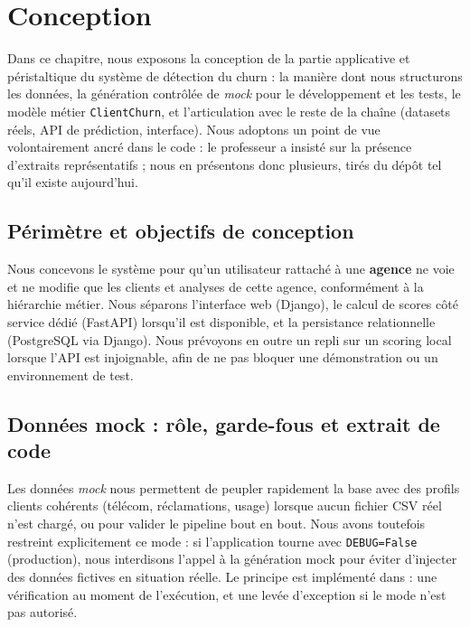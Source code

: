 
\chapter{Conception}

Dans ce chapitre, nous exposons la conception de la partie applicative et péristaltique du système de détection du churn : la manière dont nous structurons les données, la génération contrôlée de \emph{mock} pour le développement et les tests, le modèle métier \texttt{ClientChurn}, et l'articulation avec le reste de la chaîne (datasets réels, API de prédiction, interface). Nous adoptons un point de vue volontairement ancré dans le code : le professeur a insisté sur la présence d'extraits représentatifs ; nous en présentons donc plusieurs, tirés du dépôt tel qu'il existe aujourd'hui.

\section{Périmètre et objectifs de conception}

Nous concevons le système pour qu'un utilisateur rattaché à une \textbf{agence} ne voie et ne modifie que les clients et analyses de cette agence, conformément à la hiérarchie métier. Nous séparons l'interface web (Django), le calcul de scores côté service dédié (FastAPI) lorsqu'il est disponible, et la persistance relationnelle (PostgreSQL via Django). Nous prévoyons en outre un repli sur un scoring local lorsque l'API est injoignable, afin de ne pas bloquer une démonstration ou un environnement de test.

\section{Données mock : rôle, garde-fous et extrait de code}

Les données \emph{mock} nous permettent de peupler rapidement la base avec des profils clients cohérents (télécom, réclamations, usage) lorsque aucun fichier CSV réel n'est chargé, ou pour valider le pipeline bout en bout. Nous avons toutefois restreint explicitement ce mode : si l'application tourne avec \texttt{DEBUG=False} (production), nous interdisons l'appel à la génération mock pour éviter d'injecter des données fictives en situation réelle. Le principe est implémenté dans  : une vérification au moment de l'exécution, et une levée d'exception si le mode n'est pas autorisé.


